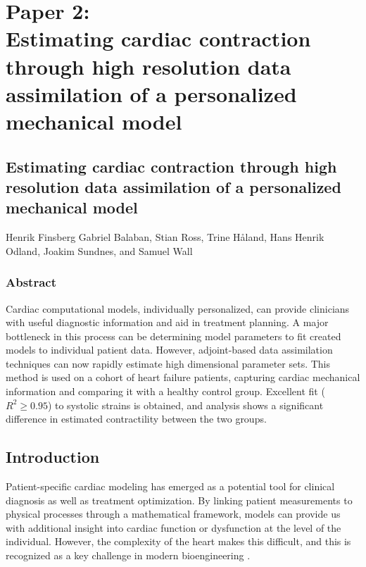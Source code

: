  
\graphicspath{{chapters/paper2/figures/}}


\chapter{Paper 2: \\Estimating cardiac contraction through high resolution data
  assimilation of a personalized mechanical model}

\newpage
\section*{Estimating cardiac contraction through high resolution data
  assimilation of a personalized mechanical model}

\begin{center}
  Henrik Finsberg
  Gabriel Balaban,
  Stian Ross,
  Trine H\r{a}land,
  Hans Henrik Odland, 
  Joakim Sundnes, and
  Samuel Wall
\end{center}

 
\subsection*{Abstract}
  
Cardiac computational models, individually personalized, can provide
clinicians with useful diagnostic information and aid in
treatment planning.  A major bottleneck in this process can be  
determining model parameters to fit created models to individual
patient data. However, adjoint-based data assimilation techniques can
now rapidly estimate high dimensional parameter sets.  This method is
used on a cohort of heart failure patients, capturing cardiac mechanical
information and comparing it with a healthy control group.  Excellent
fit ($R^2 \geq 0.95$) to systolic strains is obtained, and analysis
shows a significant difference in estimated contractility between the
two groups.


\newpage
\section{Introduction}
\label{sec:introduction}

Patient-specific cardiac modeling has emerged as a potential tool
for clinical diagnosis as well as treatment
 optimization\cite{viceconti2016virtual}.  By linking
patient measurements to physical processes through a mathematical
framework, models can provide us with additional insight into
cardiac function or dysfunction at the level of the
individual. However, the complexity of the heart makes this difficult,
and this is recognized as a key challenge in modern bioengineering
\cite{hunter2010vision}. 

